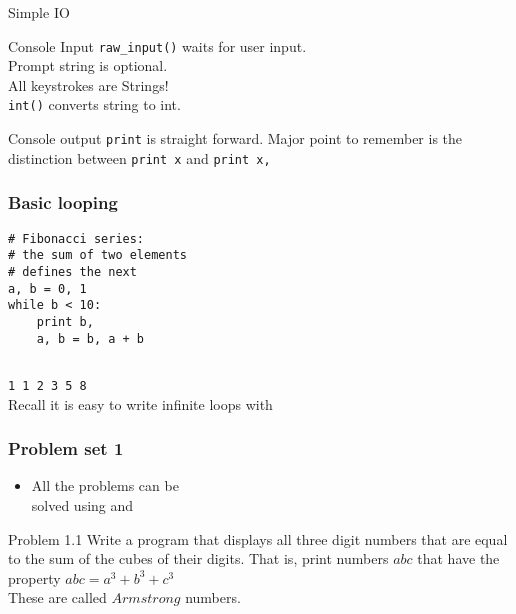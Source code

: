 \documentclass[14pt,compress]{beamer}
\newcounter{time}
\newcommand{\inctime}[1]{\addtocounter{time}{#1}{\tiny \thetime\ m}}
\newcommand{\typ}[1]{\texttt{#1}}
\newcommand{\kwrd}[1]{ \texttt{\textbf{\color{blue}{#1}}}  }
\begin{document}
\begin{frame}{Simple IO}
  \begin{block}
    {Console Input}
    \texttt{raw\_input()} waits for user input.\\Prompt string is optional.\\
    All keystrokes are Strings!\\\texttt{int()} converts string to int.
  \end{block}
  \begin{block}
    {Console output}
    \texttt{print} is straight forward. Major point to remember is the distinction between \texttt{print x} and \texttt{print x,}
  \end{block}
\end{frame}

\begin{frame}[fragile]
  \frametitle{Basic looping}
  \begin{lstlisting}
# Fibonacci series:
# the sum of two elements
# defines the next
a, b = 0, 1
while b < 10:
    print b,
    a, b = b, a + b
 
\end{lstlisting}
\typ{1 1 2 3 5 8}\\  
\alert{Recall it is easy to write infinite loops with \kwrd{while}}
  \inctime{20}
\end{frame}


\begin{frame}
  \frametitle{Problem set 1}
  \begin{itemize}
    \item All the problems can be\\
      solved using \kwrd{if} and \kwrd{while} 
  \end{itemize}
\end{frame}

\begin{frame}{Problem 1.1}
  Write a program that displays all three digit numbers that are equal to the sum of the cubes of their digits. That is, print numbers $abc$ that have the property $abc = a^3 + b^3 + c^3$\\
These are called $Armstrong$ numbers.
\end{frame}
  
\end{document}
